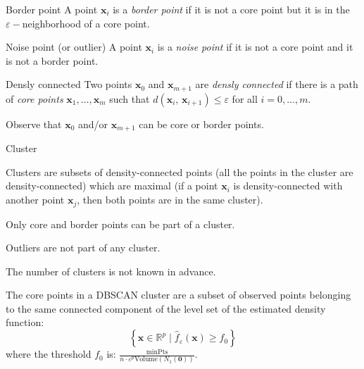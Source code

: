 \begin{definition}{Border point}{}
    A point $\boldsymbol{x}_i$ is a \emph{border point} if it is not a core point but it is
    in the $\varepsilon-$neighborhood of a core point.
\end{definition}

\begin{definition}{Noise point (or outlier)}{}
    A point $\boldsymbol{x}_i$ is a \emph{noise point} if it is not a core point and it is not a border point.
\end{definition}

\begin{definition}{Densly connected}{}
    Two points $\boldsymbol{x}_0$ and $\boldsymbol{x}_{m+1}$ are \emph{densly connected} if
    there is a path of \emph{core points} $\boldsymbol{x}_1, \ldots, \boldsymbol{x}_{m}$ such
    that $d(\boldsymbol{x}_i,\,\boldsymbol{x}_{i+1}) \leq \varepsilon$ for all $i = 0, \ldots, m$.

    \tcblower
    Observe that $\boldsymbol{x}_0$ and/or $\boldsymbol{x}_{m+1}$ can be core or border points.
\end{definition}

\begin{definition}{Cluster}{}
    
    Clusters are subsets of density-connected points (all the points in the cluster are
    density-connected) which are maximal (if a point $\boldsymbol{x}_i$ is density-connected
    with another point $\boldsymbol{x}_j$, then both points are in the same cluster).

    \tcblower

    Only core and border points can be part of a cluster.

    Outliers are not part of any cluster.

    The number of clusters is not known in advance.

    The core points in a DBSCAN cluster are a subset of observed points belonging to the same
    connected component of the level set of the estimated density function:
    \begin{equation*}
        \left\{
            \boldsymbol x \in \mathds{R}^p \mid \hat{f}_\varepsilon(\boldsymbol x) \geq f_0
        \right\}
    \end{equation*}
    where the threshold $f_0$ is: $\frac{\text{minPts}}{n \cdot \varepsilon^p \text{Volume}(N_{1}(\boldsymbol{0}))}$.
    
\end{definition}

